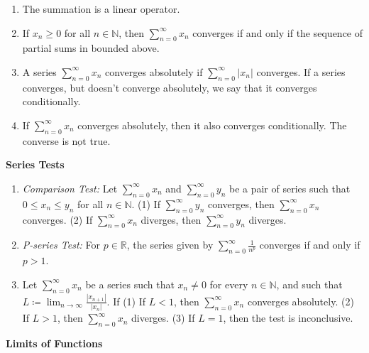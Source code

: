 \documentclass[12pt]{article}
\newcommand{\limtoinf}[1][n]{\displaystyle\lim_{ {#1} \to \infty}}
\newcommand{\abs}[1]{\left| {#1} \right|}
\newcommand{\series}[2]{\displaystyle \sum_{ {#1} }^{ {#2} }}
\newcommand{\bR}{\mathbb{R}}
\newcommand{\bN}{\mathbb{N}}
\begin{document}
\begin{enumerate}
	\item The summation is a linear operator.
	\item If $x_n\ge 0$ for all $n\in\bN$, then $\series{n=0}{\infty} x_n$ converges if and only if the sequence of partial sums in bounded above.
	\item A series $\series{n=0}{\infty} x_n$ converges absolutely if $\series{n=0}{\infty} \abs{x_n}$ converges. If a series converges, but doesn't converge absolutely, we say that it converges conditionally.
	\item If $\series{n=0}{\infty} x_n$ converges absolutely, then it also converges conditionally. The converse is $\underline{\text{not}}$ true.
\end{enumerate}

\noindent \textbf{Series Tests}

\begin{enumerate}
	\item \textit{Comparison Test:} Let $\series{n=0}{\infty} x_n$ and $\series{n=0}{\infty} y_n$ be a pair of series such that $0\le x_n\le y_n$ for all $n\in\bN$. (1) If $\series{n=0}{\infty} y_n$ converges, then $\series{n=0}{\infty} x_n$ converges. (2) If $\series{n=0}{\infty} x_n$ diverges, then $\series{n=0}{\infty} y_n$ diverges.
	\item \textit{P-series Test:} For $p\in\bR$, the series given by $\series{n=0}{\infty} \frac{1}{n^p}$ converges if and only if $p>1$.
	\item {} Let $\series{n=0}{\infty} x_n$ be a series such that $x_n\neq 0$ for every $n\in\bN$, and such that $L\coloneq\limtoinf\frac{\abs{x_{n+1}}}{\abs{x_n}}$. If (1) If $L<1$, then $\series{n=0}{\infty} x_n$ converges absolutely. (2) If $L>1$, then $\series{n=0}{\infty} x_n$ diverges. (3) If $L=1$, then the test is inconclusive.
\end{enumerate}

\noindent \textbf{Limits of Functions}
\end{document}
